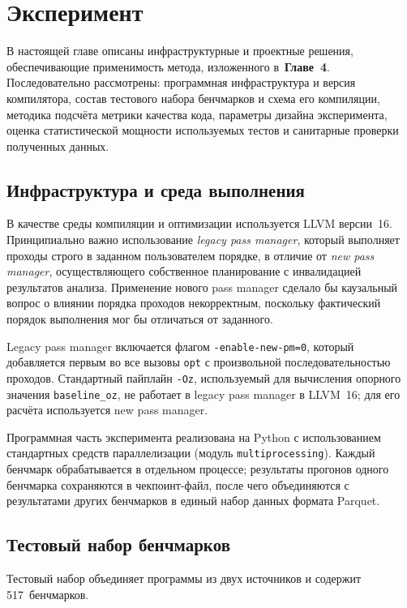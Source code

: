 \section{Эксперимент}

В настоящей главе описаны инфраструктурные и проектные решения, обеспечивающие применимость метода, изложенного в~\textbf{Главе~4}. Последовательно рассмотрены: программная инфраструктура и версия компилятора, состав тестового набора бенчмарков и схема его компиляции, методика подсчёта метрики качества кода, параметры дизайна эксперимента, оценка статистической мощности используемых тестов и санитарные проверки полученных данных.

\subsection{Инфраструктура и среда выполнения}

В качестве среды компиляции и оптимизации используется LLVM версии~16. Принципиально важно использование \emph{legacy pass manager}, который выполняет проходы строго в заданном пользователем порядке, в отличие от \emph{new pass manager}, осуществляющего собственное планирование с инвалидацией результатов анализа. Применение нового pass manager сделало бы каузальный вопрос о влиянии порядка проходов некорректным, поскольку фактический порядок выполнения мог бы отличаться от заданного.

Legacy pass manager включается флагом \texttt{-enable-new-pm=0}, который добавляется первым во все вызовы \texttt{opt} с произвольной последовательностью проходов. Стандартный пайплайн \texttt{-Oz}, используемый для вычисления опорного значения \texttt{baseline\_oz}, не работает в legacy pass manager в LLVM~16; для его расчёта используется new pass manager.

Программная часть эксперимента реализована на Python с использованием стандартных средств параллелизации (модуль \texttt{multiprocessing}). Каждый бенчмарк обрабатывается в отдельном процессе; результаты прогонов одного бенчмарка сохраняются в чекпоинт-файл, после чего объединяются с результатами других бенчмарков в единый набор данных формата Parquet.

\subsection{Тестовый набор бенчмарков}

Тестовый набор объединяет программы из двух источников и содержит 517~бенчмарков.


